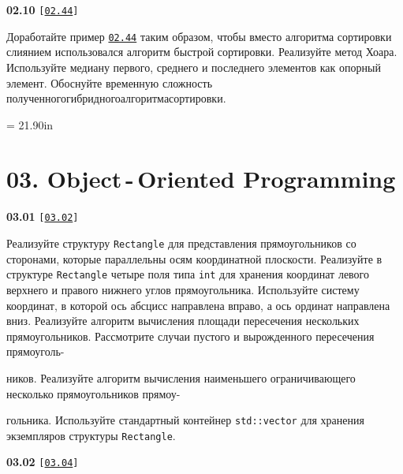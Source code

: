 \documentclass[a4paper,12pt]{article}
\begin{document}
\bigskip

{\large \textbf{02.10} \texttt{[\href{https://github.com/i-s-m-mipt/Education/blob/master/projects/examples/source/02.44.cpp}{\texttt{02.44}}]}}

\bigskip

Доработайте пример \href{https://github.com/i-s-m-mipt/Education/blob/master/projects/examples/source/02.44.cpp}{\texttt{02.44}} таким образом, чтобы вместо алгоритма сортировки слиянием использовался алгоритм быстрой сортировки. Реализуйте метод Хоара. Используйте медиану первого, среднего и последнего элементов как опорный элемент. Обоснуйте временную сложность полученного\;гибридного\;алгоритма\;сортировки.



\newpage\thispagestyle{empty}\pdfpageheight = 21.90in\enlargethispage{100in}

\section{03. Object\,-\,Oriented Programming}

{\large \textbf{03.01} \texttt{[\href{https://github.com/i-s-m-mipt/Education/blob/master/projects/examples/source/03.02.cpp}{\texttt{03.02}}]}}

\bigskip

Реализуйте структуру \lstinline{Rectangle} для представления прямоугольников со сторонами, которые параллельны осям координатной плоскости. Реализуйте в структуре \lstinline{Rectangle} четыре поля типа \lstinline{int} для хранения координат левого верхнего и правого нижнего углов прямоугольника. Используйте систему координат, в которой ось абсцисс направлена вправо, а ось ординат направлена вниз. Реализуйте алгоритм вычисления площади пересечения нескольких прямоугольников. Рассмотрите случаи пустого и вырожденного пересечения прямоуголь- 

ников. Реализуйте алгоритм вычисления наименьшего ограничивающего несколько прямоугольников прямоу-

гольника. Используйте стандартный контейнер \lstinline{std::vector} для хранения экземпляров структуры \lstinline{Rectangle}.

\bigskip

{\large \textbf{03.02} \texttt{[\href{https://github.com/i-s-m-mipt/Education/blob/master/projects/examples/source/03.04.cpp}{\texttt{03.04}}]}}

\bigskip
\end{document}

